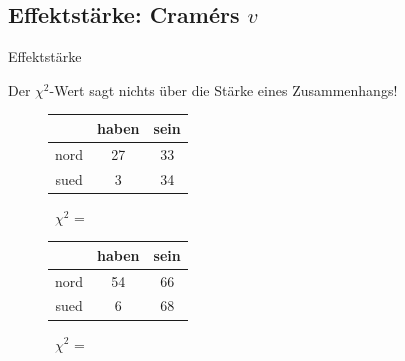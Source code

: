 \subsection[Effektstärke]{Effektstärke: Cramérs $v$}

\begin{frame}{Effektstärke}

  Der $\chi^2$-Wert sagt nichts über die \alert{Stärke eines Zusammenhangs}!\\

  \begin{figure}[h]
    \centering
    \begin{tabular}{|c|c|c|}
      \hline
      &  haben & sein\\
      \hline
      nord   &  27      & 33 \\
      \hline
	sued   &   3      & 34 \\
      \hline
    \end{tabular}~$\chi^2$ = ~
  \end{figure}

  \begin{figure}[h]
    \centering
    \begin{tabular}{|c|c|c|}
      \hline
	    &  haben & sein\\
      \hline
	nord   &  54      & 66 \\
      \hline
	sued   &  6     & 68 \\
      \hline
      \end{tabular}~$\chi^2$ = ~
  \end{figure}
\end{frame}


